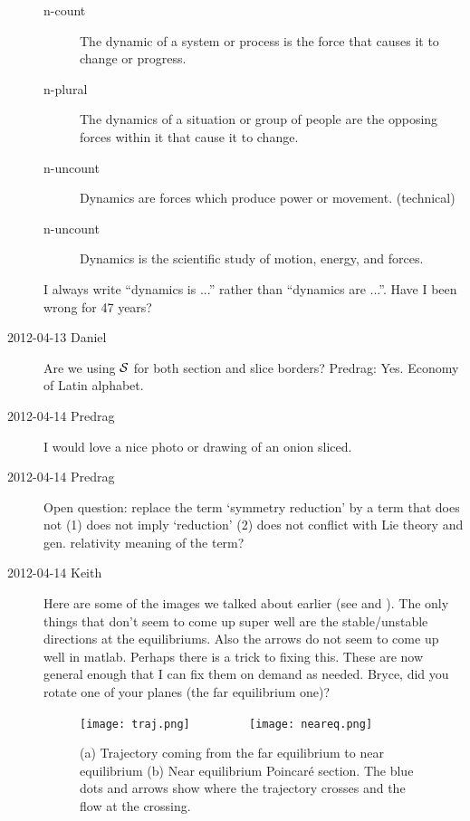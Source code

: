 \begin{description}
\begin{description}
\item[n-count]  The dynamic of a system or process is the force that
                causes it to change or progress.
\item[n-plural] The dynamics of a situation or group of people are the
                opposing forces within it that cause it to change.
\item[n-uncount]  Dynamics are forces which produce power or movement.    (technical)
\item[n-uncount]  Dynamics is the scientific study of motion, energy, and forces.
\end{description}

I always write ``dynamics is ...'' rather than ``dynamics are ...''. Have I been wrong for 47 years?

\item[2012-04-13 Daniel]
Are we using $\cal{S}$ for both section and slice borders? Predrag: Yes. Economy of Latin alphabet.

\item[2012-04-14  Predrag]
I would love a nice photo or drawing of an onion sliced.

\item[2012-04-14 Predrag]       \toCB
Open question: replace the term `symmetry reduction' by a term that does not
    (1) does not imply `reduction' (2) does not conflict with Lie theory
    and gen. relativity meaning of the term?

\item[2012-04-14 Keith] Here are some of the images we talked about earlier (see  and ).  The only things that don't seem to come up super well are the stable/unstable directions at the equilibriums.  Also the arrows do not seem to come up well in matlab.  Perhaps there is a trick to fixing this.  These are now general enough that I can fix them on demand as needed.  Bryce, did you rotate one of your planes (the far equilibrium one)?
    \begin{figure}
    \begin{center}
    \texttt{[image: traj.png]}%
~~~~~~~~
    \texttt{[image: neareq.png]}%
    \end{center}
    \caption{
    (a)
    Trajectory coming from the far equilibrium to near equilibrium
    (b)
    Near equilibrium Poincar\'e section.  The blue dots and arrows show
    where the trajectory crosses and the flow at the crossing.
        }{\label{fig:2poin}}
 \end{figure}


\end{description}

